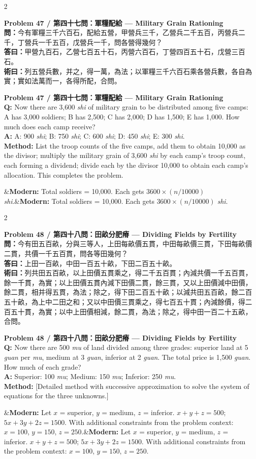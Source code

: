 \documentclass[11pt,a4paper]{article}
\newcommand{\bilingualproblem}[4]{%
  \begin{paracol}{2}
  \begin{leftcolumn}
  \noindent\textbf{\color{problemcolor}#1}\\[0.2cm]
  #2
  \end{leftcolumn}
  \switchcolumn
  \noindent\textbf{\color{problemcolor}#1}\\[0.2cm]
  #3
  \end{paracol}
  \ifx&#4&\else\vspace{0.3cm}\noindent#4\fi
  \vspace{0.5cm}
}
\newcommand{\wen}[1]{\textcolor{problemcolor}{\textbf{問：}}#1}
\newcommand{\da}[1]{\textcolor{answercolor}{\textbf{答曰：}}#1}
\newcommand{\shu}[1]{\textcolor{methodcolor}{\textbf{術曰：}}#1}
\newcommand{\wenen}[1]{\textcolor{problemcolor}{\textbf{Q:}} #1}
\newcommand{\daen}[1]{\textcolor{answercolor}{\textbf{A:}} #1}
\newcommand{\shuen}[1]{\textcolor{methodcolor}{\textbf{Method:}} #1}
\begin{document}
\bilingualproblem{Problem 47 / 第四十七問：軍糧配給 --- Military Grain Rationing}{
\wen{今有軍糧三千六百石，配給五營，甲營兵三千，乙營兵二千五百，丙營兵二千，丁營兵一千五百，戊營兵一千，問各營得幾何？}\\[0.2cm]
\da{甲營九百石，乙營七百五十石，丙營六百石，丁營四百五十石，戊營三百石。}\\[0.2cm]
\shu{列五營兵數，并之，得一萬，為法；以軍糧三千六百石乘各營兵數，各自為實；實如法萬而一，各得所配，合問。}
}{
\wenen{Now there are 3,600 \textit{shi} of military grain to be distributed among five camps: A has 3,000 soldiers; B has 2,500; C has 2,000; D has 1,500; E has 1,000. How much does each camp receive?}\\[0.2cm]
\daen{A: 900 \textit{shi}; B: 750 \textit{shi}; C: 600 \textit{shi}; D: 450 \textit{shi}; E: 300 \textit{shi}.}\\[0.2cm]
\shuen{List the troop counts of the five camps, add them to obtain 10,000 as the divisor; multiply the military grain of 3,600 \textit{shi} by each camp's troop count, each forming a dividend; divide each by the divisor 10,000 to obtain each camp's allocation. This completes the problem.}
}{\textbf{Modern:} Total soldiers = 10,000. Each gets $3600 \times (n/10000)$ \textit{shi}.}

\bilingualproblem{Problem 48 / 第四十八問：田畝分肥瘠 --- Dividing Fields by Fertility}{
\wen{今有田五百畝，分與三等人，上田每畝價五貫，中田每畝價三貫，下田每畝價二貫，共價一千五百貫，問各等田幾何？}\\[0.2cm]
\da{上田一百畝，中田一百五十畝，下田二百五十畝。}\\[0.2cm]
\shu{列共田五百畝，以上田價五貫乘之，得二千五百貫；內減共價一千五百貫，餘一千貫，為實；以上田價五貫內減下田價二貫，餘三貫，又以上田價減中田價，餘二貫，相并得五貫，為法；除之，得下田二百五十畝；以減共田五百畝，餘二百五十畝，為上中二田之和；又以中田價三貫乘之，得七百五十貫；內減餘價，得二百五十貫，為實；以中上田價相減，餘二貫，為法；除之，得中田一百二十五畝，合問。}
}{
\wenen{Now there are 500 \textit{mu} of land divided among three grades: superior land at 5 \textit{guan} per \textit{mu}, medium at 3 \textit{guan}, inferior at 2 \textit{guan}. The total price is 1,500 \textit{guan}. How much of each grade?}\\[0.2cm]
\daen{Superior: 100 \textit{mu}; Medium: 150 \textit{mu}; Inferior: 250 \textit{mu}.}\\[0.2cm]
\shuen{[Detailed method with successive approximation to solve the system of equations for the three unknowns.]}
}{\textbf{Modern:} Let $x$ = superior, $y$ = medium, $z$ = inferior. $x + y + z = 500$; $5x + 3y + 2z = 1500$. With additional constraints from the problem context: $x = 100$, $y = 150$, $z = 250$.}
\end{document}
